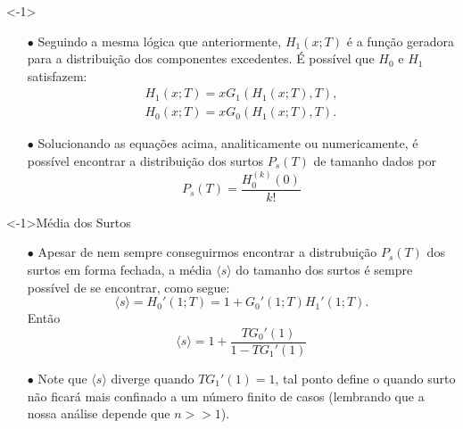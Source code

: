 \documentclass{beamer}
\begin{document}
\begin{frame}

\begin{exampleblock}
    <-1>{}
    \begin{itemize}
        \item[$\bullet$] Seguindo a mesma lógica que anteriormente, $H_1 (x;T)$ é a função geradora 
            para a distribuição dos componentes excedentes. É possível que $H_0$ e $H_1$ satisfazem: 
            \begin{align}
                H_1 (x; T) = x G_1 ( H_1 (x; T), T), \\
                H_0 (x; T) = x G_0 ( H_1 (x; T), T).
            \end{align}
        \item[$\bullet$] Solucionando as equações acima, analiticamente ou numericamente, é possível 
            encontrar a distribuição dos surtos $P_s (T)$ de tamanho dados por 
            \begin{equation}
                P_s (T) = \frac{H_0 ^{(k)}(0)}{k!}
            \end{equation}
    \end{itemize}

\end{exampleblock}



\end{frame}




\begin{frame}

\begin{exampleblock}
    <-1>{Média dos Surtos}
    \begin{itemize}
        \item[$\bullet$] Apesar de nem sempre conseguirmos encontrar a distrubuição $P_s (T)$ 
            dos surtos em forma fechada, a média $\langle s \rangle$ do tamanho dos surtos é 
            sempre possível de se encontrar, como segue:
            \begin{equation}
                \langle s \rangle = H_0 ' (1; T) = 1 + G_0 ' (1;T) H_1 ' (1;T). 
            \end{equation}
            Então 
            \begin{equation}
                \langle s \rangle = 1 + \frac{T G_0 ' (1) }{1 - T G_1 ' (1)} 
            \end{equation}
        \item[$\bullet$] Note que $\langle s \rangle$ diverge quando $T G_1 ' (1) = 1$, tal ponto 
            define o quando surto não ficará mais confinado a um número finito de casos (lembrando 
            que a nossa análise depende que $n>>1$).
    \end{itemize}
    
\end{exampleblock}



\end{frame}
\end{document}
